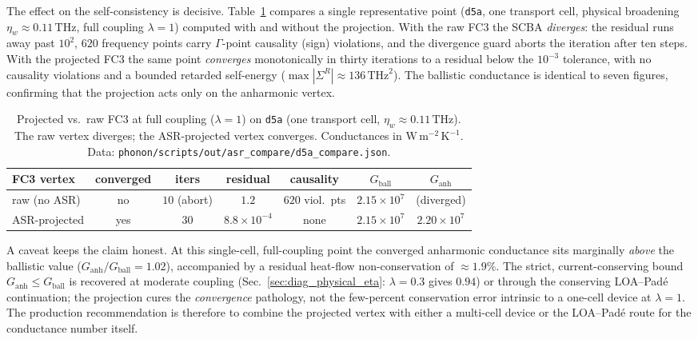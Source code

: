 The effect on the self-consistency is decisive. Table~\ref{tab:asr_compare}
compares a single representative point (\texttt{d5a}, one transport cell, physical
broadening $\eta_w\!\approx\!0.11\,\mathrm{THz}$, full coupling $\lambda=1$) computed
with and without the projection. With the raw FC3 the SCBA \emph{diverges}: the
residual runs away past $10^2$, $620$ frequency points carry $\Gamma$-point
causality (sign) violations, and the divergence guard aborts the iteration after ten
steps. With the projected FC3 the same point \emph{converges} monotonically in
thirty iterations to a residual below the $10^{-3}$ tolerance, with no causality
violations and a bounded retarded self-energy ($\max|\Sigma^R|\approx136\,\mathrm{THz}^2$).
The ballistic conductance is identical to seven figures, confirming that the
projection acts only on the anharmonic vertex.

\begin{table}[htb]
  \centering
  \caption{Projected vs.\ raw FC3 at full coupling ($\lambda=1$) on \texttt{d5a}
  (one transport cell, $\eta_w\!\approx\!0.11\,\mathrm{THz}$). The raw vertex
  diverges; the ASR-projected vertex converges. Conductances in
  $\mathrm{W\,m^{-2}\,K^{-1}}$. Data:
  \texttt{phonon/scripts/out/asr\_compare/d5a\_compare.json}.}
  \label{tab:asr_compare}
  \begin{tabular}{lcccccc}
    \toprule
    FC3 vertex & converged & iters & residual & causality & $G_\text{ball}$ & $G_\text{anh}$ \\
    \midrule
    raw (no ASR)   & no  & $10$ (abort) & $1.2$            & $620$ viol.\ pts & $2.15\times10^{7}$ & (diverged) \\
    ASR-projected  & yes & $30$         & $8.8\times10^{-4}$ & none           & $2.15\times10^{7}$ & $2.20\times10^{7}$ \\
    \bottomrule
  \end{tabular}
\end{table}

A caveat keeps the claim honest. At this single-cell, full-coupling point the
converged anharmonic conductance sits marginally \emph{above} the ballistic value
($G_\text{anh}/G_\text{ball}=1.02$), accompanied by a residual heat-flow
non-conservation of $\approx 1.9\%$. The strict, current-conserving bound
$G_\text{anh}\le G_\text{ball}$ is recovered at moderate coupling
(Sec.~\ref{sec:diag_physical_eta}: $\lambda=0.3$ gives $0.94$) or through the
conserving LOA--Pad\'e continuation; the projection cures the \emph{convergence}
pathology, not the few-percent conservation error intrinsic to a one-cell device at
$\lambda=1$. The production recommendation is therefore to combine the projected
vertex with either a multi-cell device or the LOA--Pad\'e route for the conductance
number itself.

